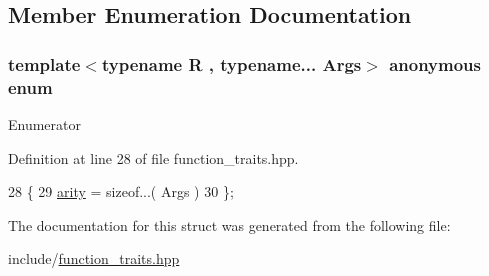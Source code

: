 \subsection{Member Enumeration Documentation}
\subsubsection[{\texorpdfstring{anonymous enum}{anonymous enum}}]{\setlength{\rightskip}{0pt plus 5cm}template$<$typename R , typename... Args$>$ anonymous enum\hspace{0.3cm}{\ttfamily [inherited]}}\hypertarget{structfn__traits_1_1function__traits_3_01_r_07_args_8_8_8_08_4_aafde9521d9646c97b984646d8273dd3b}{}\label{structfn__traits_1_1function__traits_3_01_r_07_args_8_8_8_08_4_aafde9521d9646c97b984646d8273dd3b}
\begin{Desc}
\item[Enumerator]\par
\begin{description}
\item[{\em 
arity\hypertarget{structfn__traits_1_1function__traits_3_01_r_07_args_8_8_8_08_4_aafde9521d9646c97b984646d8273dd3ba2f612b5524050ab8d6ab3d54d52dbbb0}{}\label{structfn__traits_1_1function__traits_3_01_r_07_args_8_8_8_08_4_aafde9521d9646c97b984646d8273dd3ba2f612b5524050ab8d6ab3d54d52dbbb0}
}]\end{description}
\end{Desc}


Definition at line 28 of file function\+\_\+traits.\+hpp.


\begin{DoxyCode}
28              \{
29             \hyperlink{structfn__traits_1_1function__traits_3_01_r_07_args_8_8_8_08_4_aafde9521d9646c97b984646d8273dd3ba2f612b5524050ab8d6ab3d54d52dbbb0}{arity} = \textcolor{keyword}{sizeof}...( Args )
30         \};
\end{DoxyCode}


The documentation for this struct was generated from the following file\+:\begin{DoxyCompactItemize}
\item 
include/\hyperlink{function__traits_8hpp}{function\+\_\+traits.\+hpp}\end{DoxyCompactItemize}
